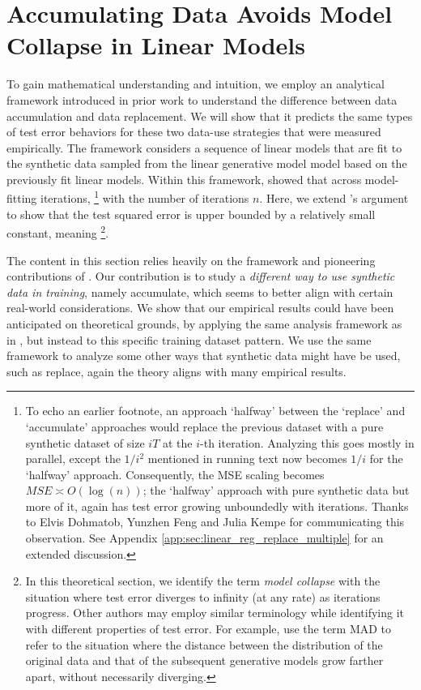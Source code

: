 \section{Accumulating Data Avoids Model Collapse in Linear Models}
\label{sec:theoretical_setup}

To gain mathematical understanding and intuition, we employ an analytical framework 
introduced in prior work \citep{mobahi2020self, dohmatob2024model} to understand 
the difference between data accumulation and data replacement. We will show that it predicts the 
same types of test error behaviors for these two data-use strategies
that were measured empirically.
The framework considers a sequence of linear models that are fit to the synthetic data sampled from the linear generative model model based on the previously fit linear models.
Within this framework, \citet{dohmatob2024model} showed that  across model-fitting iterations, \footnote{To echo an earlier footnote, an approach `halfway' between the `replace' and `accumulate' approaches would replace the previous dataset with a pure synthetic dataset of size $iT$ at the $i$-th iteration. Analyzing this goes mostly in parallel, except the $1/i^2$ mentioned in running text now becomes $1/i$ for the `halfway' approach. Consequently, the MSE scaling becomes $MSE \asymp O(\log(n))$; the `halfway' approach with pure synthetic data but more of it, again has test error growing unboundedly with iterations. Thanks to Elvis Dohmatob, Yunzhen Feng and Julia Kempe for communicating this observation. See Appendix \ref{app:sec:linear_reg_replace_multiple} for an extended discussion.} with the number of iterations $n$. Here, we extend \citet{dohmatob2024model}'s argument to show that  the test squared error is upper bounded by a relatively small constant, meaning \footnote{In this theoretical section, we identify the term \textit{model collapse} with the situation where test error diverges to infinity (at any rate) as iterations progress. Other authors may employ similar terminology while identifying it with different properties of test error. For example, \cite{alemohammad2023self} use the term MAD to refer to the situation where the distance between the distribution of the original data and that of the subsequent generative models grow farther apart, without necessarily diverging.}.

The content in this section relies heavily on the framework and pioneering contributions of \citet{dohmatob2024model}. Our contribution is to study a  {\it different way to use synthetic data in training}, namely accumulate, which seems to better align with certain real-world considerations. We show that our empirical results could have been anticipated on theoretical grounds, by applying the same analysis framework as in \citet{dohmatob2024model}, but instead to this specific training dataset pattern. We use the same framework to analyze some other ways that synthetic data might have be used, such as replace,  again the theory aligns with many empirical results.

